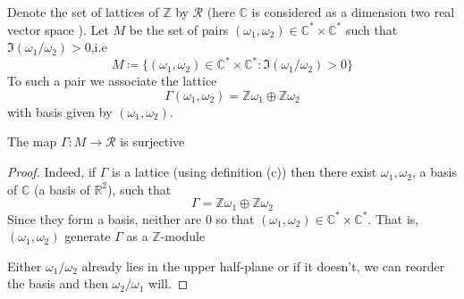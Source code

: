 \documentclass[12pt]{article}
\theoremstyle{definition}
\begin{document}
Denote the set of lattices of \(\mathbb{Z} \)  by \(\mathscr{R} \) (here \(\mathbb{C} \) is considered as a dimension two real vector space ). Let \(M\) be the set of pairs \((\omega_1, \omega _2) \in \mathbb{C} ^{\ast} \times \mathbb{C} ^{\ast} \) such that \(\Im(\omega _1/\omega _2)>0\),i.e
\[
    M \coloneqq \{ (\omega _1,\omega _2)\in \mathbb{C} ^{\ast} \times \mathbb{C} ^{\ast} : \Im (\omega_1/\omega _2)>0 \} 
\] To such a pair we associate the lattice
\[
    \Gamma (\omega _1,\omega _2) = \mathbb{Z} \omega _1 \oplus \mathbb{Z} \omega _2
\]  
with basis given by \((\omega_1,\omega _2)\). 

\begin{claim}
    The map \(\Gamma : M \to \mathscr{R} \) is surjective 
\end{claim}
\begin{proof}
    Indeed, if \(\Gamma \) is a lattice (using definition (c)) then there exist \(\omega _1,\omega _2\), a basis of \(\mathbb{C} \) (a basis of \(\mathbb{R} ^2\)), such that \[\Gamma = \mathbb{Z} \omega _1\oplus \mathbb{Z} \omega _2\] Since they form a basis, neither are \(0\) so that \((\omega_1,\omega _2) \in\mathbb{C} ^{\ast} \times \mathbb{C} ^{\ast}  \). That is, \((\omega _1,\omega _2)\) generate \(\Gamma \) as a \(\mathbb{Z} \)-module       

    Either \(\omega_1/\omega _2\) already lies in the upper half-plane or if it doesn't, we can reorder the basis and then \(\omega_2/\omega_1\) will.   
\end{proof}
\end{document}
